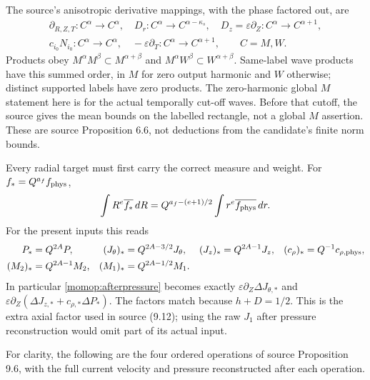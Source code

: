 \documentclass[11pt]{article}
\begin{document}
The source's anisotropic derivative mappings, with the phase factored
out, are
\[
\begin{gathered}
 \partial_{R,Z,T}:C^\alpha\to C^\alpha,\quad
 D_r:C^\alpha\to C^{\alpha-\kappa_s},\quad
 D_z=\varepsilon\partial_Z:C^\alpha\to C^{\alpha+1},\\
 c_{i_0}N_{i_0}:C^\alpha\to C^\alpha,\quad
 -\varepsilon\partial_T:C^\alpha\to C^{\alpha+1},
 \qquad C=M,W.
\end{gathered}
\]
Products obey $M^\alpha M^\beta\subset M^{\alpha+\beta}$ and
$M^\alpha W^\beta\subset W^{\alpha+\beta}$. Same-label wave
products have this summed order, in $M$ for zero output harmonic
and $W$ otherwise; distinct supported labels have zero products.
The zero-harmonic global $M$ statement here is for the actual temporally
cut-off waves. Before that cutoff, the source gives the mean bounds on
the labelled rectangle, not a global $M$ assertion.
These are source Proposition 6.6, not deductions from the candidate's
finite norm bounds.

Every radial target must first carry the correct measure and weight.
For $f_*=Q^{a_f}f_{\rm phys}$,
\[
 \int R^e\overline{f_*}\,dR
       =Q^{a_f-(e+1)/2}\int r^e\overline{f_{\rm phys}}\,dr .
\]
For the present inputs this reads
\begin{align*}
 P_*&=Q^{2A}P,&
 (J_\theta)_*&=Q^{2A-3/2}J_\theta,&
 (J_z)_*&=Q^{2A-1}J_z,&
 (c_\rho)_*&=Q^{-1}c_{\rho,\rm phys},\\
 (M_2)_*&=Q^{2A-1}M_2,&
 (M_1)_*&=Q^{2A-1/2}M_1 .
\end{align*}
In particular \eqref{momop:afterpressure} becomes exactly
$\varepsilon\partial_Z\Delta J_{\theta,*}$ and
$\varepsilon\partial_Z(\Delta J_{z,*}+c_{\rho,*}\Delta P_*)$.
The factors match because $h+D=1/2$. This is the extra axial
factor used in source (9.12); using the raw $J_1$ after pressure
reconstruction would omit part of its actual input.

For clarity, the following are the four ordered operations of source
Proposition 9.6, with the full current velocity and pressure
reconstructed after each operation.
\end{document}
